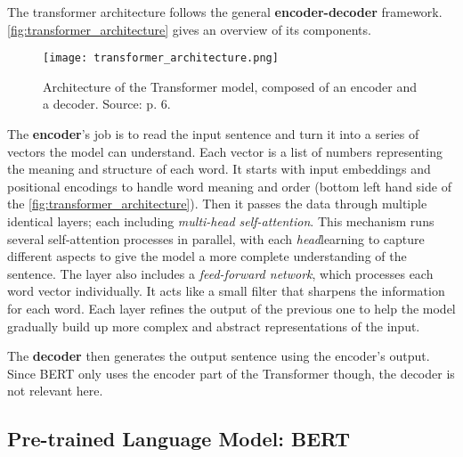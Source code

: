 The transformer architecture follows the general \textbf{encoder-decoder} framework. \autoref{fig:transformer_architecture} \citet{xiaoIntroductionTransformersNLP2023} gives an overview of its components. 

\begin{figure}
	\centering
	\texttt{[image: transformer\_architecture.png]}
	\caption{Architecture of the Transformer model, composed of an encoder and a decoder. Source: \citet{xiaoIntroductionTransformersNLP2023} p. 6.}
	\label{fig:transformer_architecture}
\end{figure}

The \textbf{encoder}’s job is to read the input sentence and turn it into a series of vectors the model can understand. Each vector is a list of numbers representing the meaning and structure of each word. It starts with input embeddings and positional encodings to handle word meaning and order (bottom left hand side of the \autoref{fig:transformer_architecture}). Then it passes the data through multiple identical layers; each including \textit{multi-head self-attention}. This mechanism runs several self-attention processes in parallel, with each \textit{head}learning to capture different aspects to give the model a more complete understanding of the sentence. The layer also includes a \textit{feed-forward network}, which processes each word vector individually. It acts like a small filter that sharpens the information for each word. Each layer refines the output of the previous one to help the model gradually build up more complex and abstract representations of the input.

The \textbf{decoder} then generates the output sentence using the encoder’s output. Since BERT only uses the encoder part of the Transformer though, the decoder is not relevant here.


\subsection{Pre-trained Language Model: BERT}


